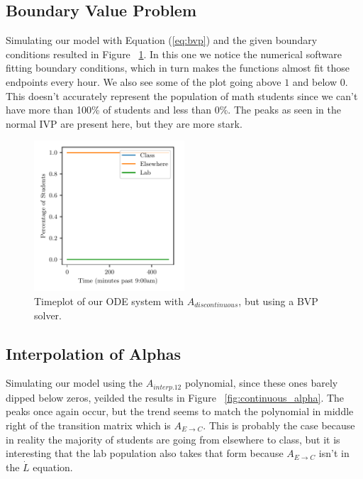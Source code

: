 \documentclass[11pt]{amsart}
\begin{document}
\subsection{Boundary Value Problem}
Simulating our model with Equation (\ref{eq:bvp}) and the given boundary conditions resulted in Figure ~\ref{fig:discontinuous_alpha_bvp}. In this one we notice the numerical software fitting
boundary conditions, which in turn makes the functions almost fit those endpoints every hour. We also see some of the plot going above $1$ and below $0$. This doesn't accurately represent the population
of math students since we can't have more than 100\% of students and less than 0\%. The peaks as seen in the normal IVP are present here, but they are more stark.
\begin{figure}[htp]
    \centering
    \includegraphics[width=0.5\textwidth]{temp.pdf}
    \caption{Timeplot of our ODE system with $A_{discontinuous}$, but using a BVP solver.}
    \label{fig:discontinuous_alpha_bvp}

\end{figure}

\subsection{Interpolation of Alphas}

Simulating our model using the $A_{interp.12}$ polynomial, since these ones barely dipped below zeros, yeilded the results in Figure ~\ref{fig:continuous_alpha}. The peaks once again occur, 
but the trend seems to match the polynomial in middle right of the transition matrix which is $A_{E \rightarrow C}$. This is probably the case because in reality the majority of students are 
going from elsewhere to class, but it is interesting that the lab population also takes that form because $A_{E \rightarrow C}$ isn't in the $\dot{L}$ equation.
\end{document}
